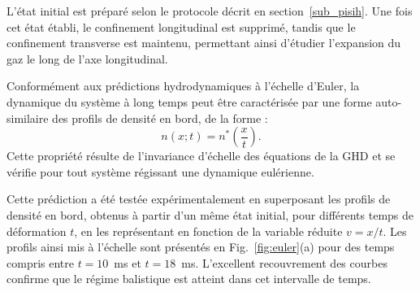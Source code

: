 

L’état initial est préparé selon le protocole décrit en section~\ref{sub_pisih}. Une fois cet état établi, le confinement longitudinal est supprimé, tandis que le confinement transverse est maintenu, permettant ainsi d'étudier l’expansion du gaz le long de l’axe longitudinal.

Conformément aux prédictions hydrodynamiques à l’échelle d’Euler, la dynamique du système à long temps peut être caractérisée par une forme auto-similaire des profils de densité en bord, de la forme :
\begin{equation}
n(x; t) = n^\ast\left(\frac{x}{t}\right).
\end{equation}
Cette propriété résulte de l’invariance d’échelle des équations de la GHD et se vérifie pour tout système régissant une dynamique eulérienne.

Cette prédiction a été testée expérimentalement en superposant les profils de densité en bord, obtenus à partir d’un même état initial, pour différents temps de déformation $t$, en les représentant en fonction de la variable réduite $v = x/t$. Les profils ainsi mis à l’échelle sont présentés en Fig.~\ref{fig:euler}(a) pour des temps compris entre $t = 10$~ms et $t = 18$~ms. L’excellent recouvrement des courbes confirme que le régime balistique est atteint dans cet intervalle de temps.

